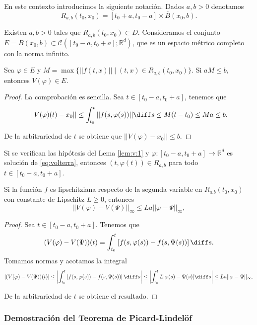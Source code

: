 \documentclass{article}
\begin{document}
En este contexto introducimos la siguiente notación. Dados $a,b > 0$ denotamos
\[R_{a,b}(t_0, x_0) = [t_0+a, t_0-a] \times \overline{B}(x_0, b).\]

Existen $a,b > 0$ tales que $R_{a,b}(t_0,x_0) \subset D$.  Consideramos el conjunto
$E = \overline{B}(x_0, b) \subset \mathcal{C}([t_0-a, t_0+a]; \mathbb{R}^d)$, que es un espacio
métrico completo con la norma infinito.

\begin{lemma} \label{lem:v:1} Sea $\varphi \in E$ y
  $M = \max \{||f(t,x)|| \mid (t,x) \in R_{a,b}(t_0, x_0)\}$. Si $aM \le b$, entonces
  $V(\varphi) \in E$.
\end{lemma}
\begin{proof}
  La comprobación es sencilla. Sea $t \in [t_0-a, t_0+a]$, tenemos que
  \[ ||V(\varphi)(t)-x_0|| \le \int_{t_0}^t ||f(s, \varphi(s))|| \diff s \le M(t-t_0) \le M a \le
    b.  \]

  De la arbitrariedad de $t$ se obtiene que $||V(\varphi)-x_0|| \le b$.
\end{proof}

\begin{remark}
  Si se verifican las hipótesis del Lema \ref{lem:v:1} y $\varphi \colon [t_0-a, t_0+a] \to \mathbb{R}^d$
  es solución de \eqref{eq:volterra}, entonces $(t, \varphi(t)) \in R_{a,b}$ para todo
  $t \in [t_0-a, t_0+a]$.
\end{remark}

\begin{lemma}
  Si la función $f$ es lipschitziana respecto de la segunda variable en $R_{a.b}(t_0, x_0)$ con
  constante de Lipschitz $L \ge 0$, entonces
  \[||V(\varphi) - V(\Psi)||_{\infty} \le La||\varphi - \Psi||_\infty,\]
\end{lemma}

\begin{proof}
  Sea $t \in [t_0-a, t_0+a]$. Tenemos que
  \[ (V(\varphi) - V(\Psi))(t) = \int_{t_{0}}^t \left[f(s, \varphi(s)) - f(s, \Psi(s))\right] \diff
    s.\] Tomamos normas y acotamos la integral
  \[|(V(\varphi) - V(\Psi))(t)| \le \left|\int_{t_{0}}^t \left|f(s, \varphi(s)) - f(s,
        \Psi(s))\right| \diff s\right| \le \left|\int_{t_{0}}^t L |\varphi(s) - \Psi(s)| \diff s
    \right| \le L a ||\varphi - \Psi||_{\infty}.\]

  De la arbitrariedad de $t$ se obtiene el resultado.
\end{proof}

\subsubsection{Demostración del Teorema de Picard-Lindelöf}
\end{document}
